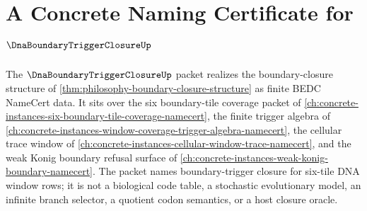 \chapter{A Concrete Naming Certificate for $\DnaBoundaryTriggerClosureUp$}
\label{ch:concrete-instances-dna-boundary-trigger-closure-namecert}

The $\DnaBoundaryTriggerClosureUp$ packet realizes the boundary-closure structure of \autoref{thm:philosophy-boundary-closure-structure} as finite BEDC NameCert data. It sits over the six boundary-tile coverage packet of \autoref{ch:concrete-instances-six-boundary-tile-coverage-namecert}, the finite trigger algebra of \autoref{ch:concrete-instances-window-coverage-trigger-algebra-namecert}, the cellular trace window of \autoref{ch:concrete-instances-cellular-window-trace-namecert}, and the weak Konig boundary refusal surface of \autoref{ch:concrete-instances-weak-konig-boundary-namecert}. The packet names boundary-trigger closure for six-tile DNA window rows; it is not a biological code table, a stochastic evolutionary model, an infinite branch selector, a quotient codon semantics, or a host closure oracle.

